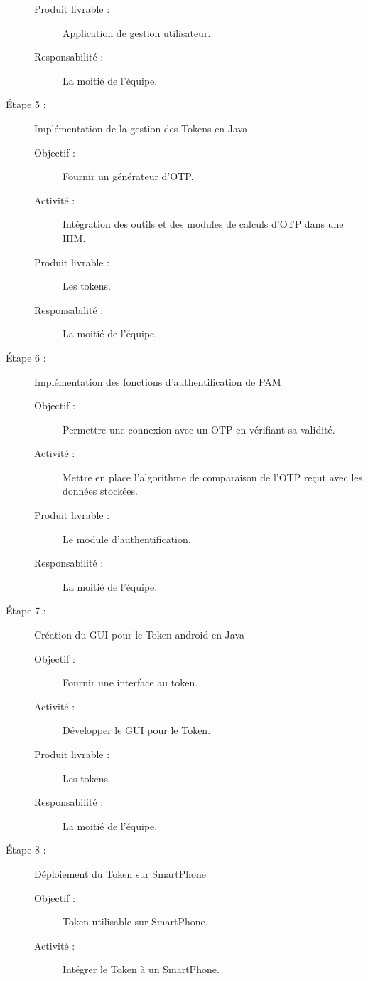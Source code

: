 \documentclass{../../res/univ-projet}
\begin{document}
\begin{description}
\begin{description}
		        \item [Produit livrable :] Application de gestion utilisateur.
		        \item [Responsabilité :] La moitié de l'équipe.
		    \end{description}
	    \item [Étape 5 :] Implémentation de la gestion des Tokens en Java
		    \begin{description}
		        \item [Objectif :] Fournir un générateur d'OTP.
		        \item [Activité :] Intégration des outils et des modules de calculs d'OTP dans une IHM.
		        \item [Produit livrable :] Les tokens.
		        \item [Responsabilité :] La moitié de l'équipe.
		    \end{description}
	    \item [Étape 6 :] Implémentation des fonctions d'authentification de PAM
		    \begin{description}
		        \item [Objectif :] Permettre une connexion avec un OTP en vérifiant sa validité.
		        \item [Activité :] Mettre en place l'algorithme de comparaison de l'OTP reçut avec les données stockées.
		        \item [Produit livrable :] Le module d'authentification.
		        \item [Responsabilité :] La moitié de l'équipe.
	            \end{description}
	    \item [Étape 7 :] Création du GUI pour le Token android en Java
		    \begin{description}
		        \item [Objectif :] Fournir une interface au token.
		        \item [Activité :] Développer le GUI pour le Token.
		        \item [Produit livrable :] Les tokens.
		        \item [Responsabilité :] La moitié de l'équipe.
		    \end{description}
	    \item [Étape 8 :] Déploiement du Token sur SmartPhone
		    \begin{description}
		        \item [Objectif :] Token utilisable sur SmartPhone.
		        \item [Activité :] Intégrer le Token à un SmartPhone.

\end{description}
\end{description}
\end{document}
